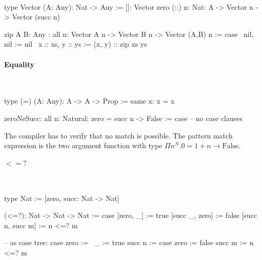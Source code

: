 \ \begin{alba}
    type Vector (A: Any): Nat -> Any :=
        []:  Vector zero
        (::) {n: Nat}: A -> Vector n -> Vector (succ n)

    zip {A B: Any}
    : all {n}: Vector A n -> Vector B n -> Vector (A,B) n
    := case
        \ nil,     nil     := nil
        \ x :: xs, y :: ys := (x, y) :: zip xs ys
\end{alba}



\paragraph{Equality}

\ \begin{alba}
    type (=) (A: Any): A -> A -> Prop :=
        same {x}: x = x

    zeroNeSucc: all {n: Natural}: zero = succ n -> False :=
        case
            -- no case clauses
\end{alba}

The compiler has to verify that no match is possible. The pattern match
expression is the two argument function with type $\Pi n^N. 0 = 1 + n \to
\text{False}$.



\paragraph{$<=?$}
\ \begin{alba}
    type Nat := [zero, succ: Nat -> Nat]

    (<=?): Nat -> Nat -> Nat := case
        [zero, _]        :=  true
        [succ _, zero]   :=  false
        [succ n, succ m] :=  n <=? m

    -- as case tree:
    case
        zero           :=   \ _ := true
        succ n :=
            case
                zero   :=   false
                succ m :=   n <=? m
\end{alba}
